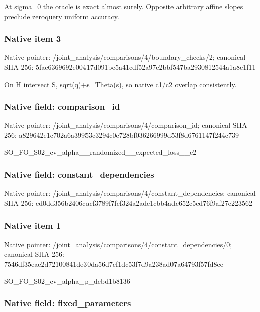 \documentclass[10pt,a4paper]{article}
\begin{document}
At sigma=0 the oracle is exact almost surely. Opposite arbitrary affine slopes preclude zeroquery uniform accuracy.


\subsubsection{Native item 3}


Native pointer: /joint\_analysis/comparis\allowbreak{}ons/4/boundary\_checks/2; canonical SHA-256: 5fac6369692e00417d091be5\allowbreak{}a41cdf52a97e2bbf547ba293\allowbreak{}0812544a1a8c1f11


On H intersect S, sqrt(q)+s=Theta(s), so native c1/c2 overlap consistently.


\subsubsection{Native field: comparison\_id}


Native pointer: /joint\_analysis/comparis\allowbreak{}ons/4/comparison\_id; canonical SHA-256: a829642e1c702a6a39953c32\allowbreak{}94c0e728bf036266999d53f8\allowbreak{}d6761147f244c739


SO\_FO\_S02\_cv\_alpha\_\_rand\allowbreak{}omized\_\_expected\_loss\_\_c\allowbreak{}2


\subsubsection{Native field: constant\_dependencies}


Native pointer: /joint\_analysis/comparis\allowbreak{}ons/4/constant\_dependenc\allowbreak{}ies; canonical SHA-256: ed0dd356b2406cacf3789f7f\allowbreak{}ef324a2ade1cbb4adc652c5c\allowbreak{}d76f9af27e223562



\subsubsection{Native item 1}


Native pointer: /joint\_analysis/comparis\allowbreak{}ons/4/constant\_dependenc\allowbreak{}ies/0; canonical SHA-256: 7546df35eae2d72100841de3\allowbreak{}0da56d7cf1dc53f7d9a238ad\allowbreak{}07a64793f57fd8ee


SO\_FO\_S02\_cv\_alpha\_p\_debd1b8136


\subsubsection{Native field: fixed\_parameters}
\end{document}
